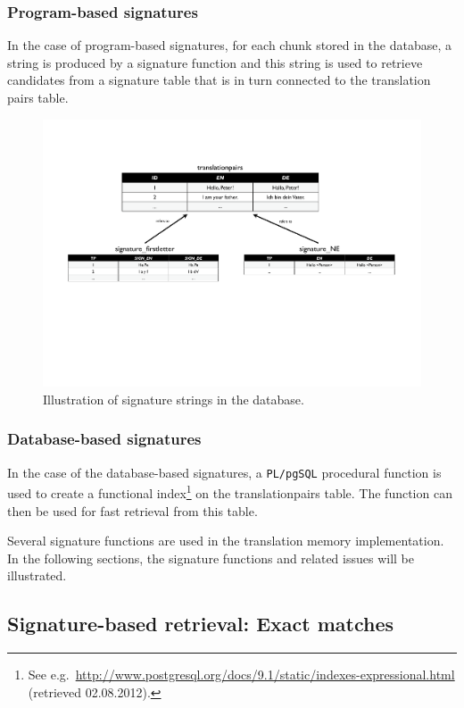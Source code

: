 \subsubsection*{Program-based signatures}

In the case of program-based signatures, for each chunk stored in the database, a string is produced by a signature function and this string is used to retrieve candidates from a signature table that is in turn
connected to the translation pairs table.

\begin{figure}[h!]
	\centering
		\includegraphics[width=17cm]{figures/core/signatures.pdf}
	\caption{Illustration of signature strings in the database.}
	\label{fig:figures_core_signatures}
\end{figure}


\subsubsection*{Database-based signatures}

In the case of the database-based signatures, a {\tt PL/pgSQL} procedural function is used to create a functional index\footnote{See e.g.\ \url{http://www.postgresql.org/docs/9.1/static/indexes-expressional.html} (retrieved 02.08.2012).} on the translationpairs table. The function can then be used for fast retrieval from this table.


Several signature functions are used in the translation memory
implementation. In the following sections, the signature functions and related issues will be illustrated.


\subsection{Signature-based retrieval: Exact matches}

